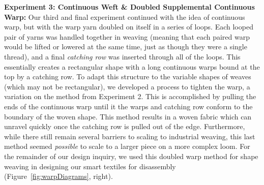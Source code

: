 \newpage
\textbf{Experiment 3: Continuous Weft \& Doubled Supplemental Continuous Warp:} Our third and final experiment continued with the idea of continuous warp, but with the warp yarn doubled on itself in a series of loops. Each looped pair of yarns was handled together in weaving (meaning that each paired warp would be lifted or lowered at the same time, just as though they were a single thread), and a final \emph{catching row} was inserted through all of the loops. This essentially creates a rectangular shape with a long continuous warps bound at the top by a catching row. To adapt this structure to the variable shapes of weaves (which may not be rectangular), we developed a process to tighten the warp, a variation on the method from Experiment 2. This is accomplished by pulling the ends of the continuous warp until it the warps and catching row conform to the boundary of the woven shape. This method results in a woven fabric which can unravel quickly once the catching row is pulled out of the edge. Furthermore, {while there still remain several barriers to scaling to industrial weaving,} this last method seemed \textit{possible} to scale to a larger piece on a more complex loom. %
For the remainder of our design inquiry, we used this doubled warp method for shape weaving in designing our smart textiles for disassembly (Figure~\ref{fig:warpDiagrams}, right).

